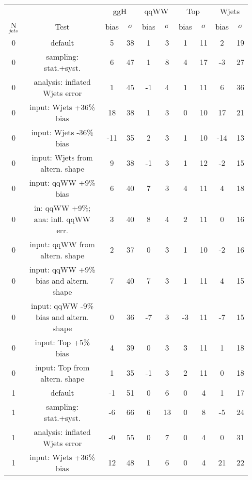 \begin{table}[!htb]
\begin{center}
\begin{tabular}{c | c  | c c | c c | c c | c c}
\hline
          &      & \multicolumn{2}{c|}{ggH} & \multicolumn{2}{c|}{qqWW} & \multicolumn{2}{c|}{Top} & \multicolumn{2}{c}{Wjets} \\
N$_{jets}$ & Test & bias & $\sigma$ & bias & $\sigma$ & bias & $\sigma$ & bias & $\sigma$ \\
\hline
0 & default                             & 5  & 38 & 1 & 3 & 1 & 11 & 2  & 19 \\
0 & sampling: stat.+syst.               & 6  & 47 & 1 & 8 & 4 & 17 &-3  & 27 \\
\hline
0 & analysis: inflated Wjets error      & 1  & 45 &-1 & 4 & 1 & 11 & 6  & 36 \\
0 & input: Wjets +36\% bias             & 18 & 38 & 1 & 3 & 0 & 10 & 17 & 21 \\
0 & input: Wjets -36\% bias             &-11 & 35 & 2 & 3 & 1 & 10 &-14 & 13 \\
0 & input: Wjets from altern. shape     & 9  & 38 &-1 & 3 & 1 & 12 &-2  & 15 \\
\hline
0 & input: qqWW +9\% bias               & 6  & 40 & 7 & 3 & 4 & 11 & 4  & 18 \\
0 & in: qqWW +9\%; ana: infl. qqWW err. & 3  & 40 & 8 & 4 & 2 & 11 & 0  & 16 \\
0 & input: qqWW from altern. shape      & 2  & 37 & 0 & 3 & 1 & 10 &-2  & 16 \\
0 & input: qqWW +9\% bias and altern. shape & 7  & 40 & 7 & 3 & 1 & 11 & 4  & 15 \\
0 & input: qqWW -9\% bias and altern. shape & 0  & 36 &-7 & 3 &-3 & 11 &-7  & 15 \\
\hline
0 & input: Top +5\% bias                & 4  & 39 & 0 & 3 & 3 & 11 & 1  & 18 \\
0 & input: Top from altern. shape       & 1  & 35 &-1 & 3 & 2 & 11 & 0  & 18 \\
\hline
\hline
1 & default                             &-1  & 51 & 0 & 6  & 0 & 4 & 1  & 17 \\
1 & sampling: stat.+syst.               &-6  & 66 & 6 & 13 & 0 & 8 &-5  & 24 \\
\hline
1 & analysis: inflated Wjets error      &-0  & 55 & 0 & 7  & 0 & 4 & 0  & 31 \\
1 & input: Wjets +36\% bias             & 12 & 48 & 1 & 6  & 0 & 4 & 21 & 22 \\

\end{tabular}
\end{center}
\end{table}
